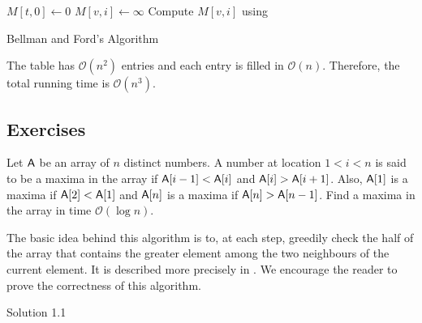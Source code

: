 \begin{algorithm}[H]
	\DontPrintSemicolon
	 {
		$M[t,0]\gets 0$\;
		 {
			$M[v,i]\gets\infty$
		}
		 {
			 {
				Compute $M[v,i]$ using \;
			}
		}
	}
	\caption{Bellman and Ford's Algorithm}\label{algo: bellman and ford}
\end{algorithm}

The table has $\mathcal{O}(n^2)$ entries and each entry is filled in $\mathcal{O}(n)$. Therefore, the total running time is $\mathcal{O}(n^3)$.


\subsection{Exercises}


\begin{exercise}
Let $\mathsf{A}$ be an array of $n$ distinct numbers. A number at location $1<i<n$ is said to be a maxima in the array if $\mathsf{A}[i-1]<\mathsf{A}[i]$ and $\mathsf{A}[i]>\mathsf{A}[i+1]$. Also, $\mathsf{A}[1]$ is a maxima if $\mathsf{A}[2]<\mathsf{A}[1]$ and $\mathsf{A}[n]$ is a maxima if $\mathsf{A}[n]>\mathsf{A}[n-1]$. Find a maxima in the array in time $\mathcal{O}(\log n)$.
\end{exercise}
\begin{solution*}
	The basic idea behind this algorithm is to, at each step, greedily check the half of the array that contains the greater element among the two neighbours of the current element. It is described more precisely in . We encourage the reader to prove the correctness of this algorithm.
\end{solution*}
\begin{algorithm}
	\DontPrintSemicolon
	\caption{Solution 1.1}\label{algo: find maxima}
\end{algorithm}


